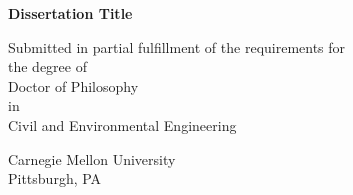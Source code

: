 \begin{titlepage}
    \begin{center}
	
	\vspace*{1.5cm}
	
        \textbf{Dissertation Title}
        
        \vspace{1.5cm}
        
        \normalsize
        \doublespacing
        Submitted in partial fulfillment of the requirements for\\
        the degree of\\
        Doctor of Philosophy\\
        in \\
        Civil and Environmental Engineering
        
        \singlespacing
        \vspace{1.5cm}
        
        
        \vspace{0.8cm}
        
        
        \vfill
        
        Carnegie Mellon University\\
        Pittsburgh, PA
        
        \vspace{0.8cm}
        
        
    \end{center}
\end{titlepage}
